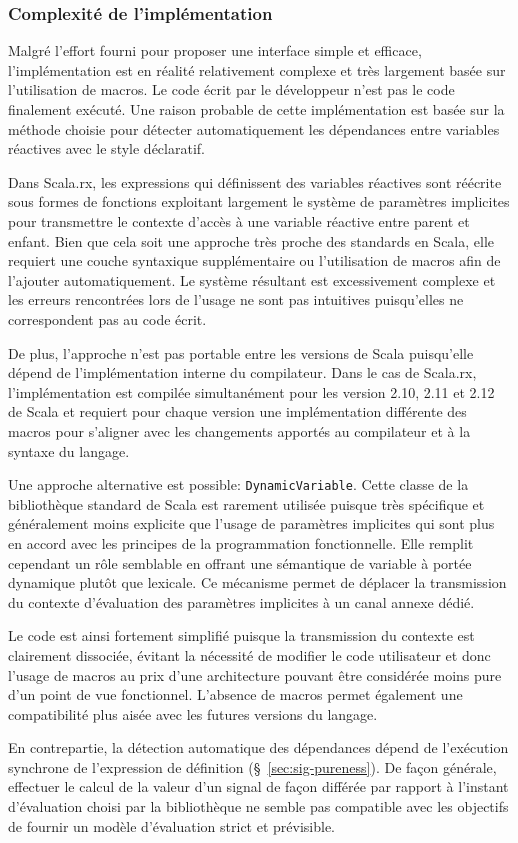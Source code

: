 \subsubsection{Complexité de l'implémentation}
Malgré l'effort fourni pour proposer une interface simple et efficace, l'implémentation est en réalité relativement complexe et très largement basée sur l'utilisation de macros. Le code écrit par le développeur n'est pas le code finalement exécuté. Une raison probable de cette implémentation est basée sur la méthode choisie pour détecter automatiquement les dépendances entre variables réactives avec le style déclaratif.

Dans Scala.rx, les expressions qui définissent des variables réactives sont réécrite sous formes de fonctions exploitant largement le système de paramètres implicites pour transmettre le contexte d'accès à une variable réactive entre parent et enfant. Bien que cela soit une approche très proche des standards en Scala, elle requiert une couche syntaxique supplémentaire ou l'utilisation de macros afin de l'ajouter automatiquement. Le système résultant est excessivement complexe et les erreurs rencontrées lors de l'usage ne sont pas intuitives puisqu'elles ne correspondent pas au code écrit. 

De plus, l'approche n'est pas portable entre les versions de Scala puisqu'elle dépend de l'implémentation interne du compilateur. Dans le cas de Scala.rx, l'implémentation est compilée simultanément pour les version 2.10, 2.11 et 2.12 de Scala et requiert pour chaque version une implémentation différente des macros pour s'aligner avec les changements apportés au compilateur et à la syntaxe du langage.

Une approche alternative est possible: \texttt{DynamicVariable}. Cette classe de la bibliothèque standard de Scala est rarement utilisée puisque très spécifique et généralement moins explicite que l'usage de paramètres implicites qui sont plus en accord avec les principes de la programmation fonctionnelle. Elle remplit cependant un rôle semblable en offrant une sémantique de variable à portée dynamique plutôt que lexicale. Ce mécanisme permet de déplacer la transmission du contexte d'évaluation des paramètres implicites à un canal annexe dédié.

Le code est ainsi fortement simplifié puisque la transmission du contexte est clairement dissociée, évitant la nécessité de modifier le code utilisateur et donc l'usage de macros au prix d'une architecture pouvant être considérée moins pure d'un point de vue fonctionnel. L'absence de macros permet également une compatibilité plus aisée avec les futures versions du langage.

En contrepartie, la détection automatique des dépendances dépend de l'exécution synchrone de l'expression de définition (§~\ref{sec:sig-pureness}). De façon générale, effectuer le calcul de la valeur d'un signal de façon différée par rapport à l'instant d'évaluation choisi par la bibliothèque ne semble pas compatible avec les objectifs de fournir un modèle d'évaluation strict et prévisible.

